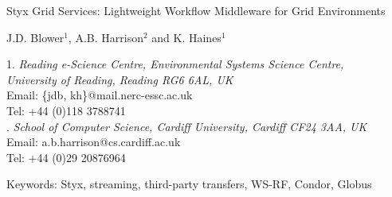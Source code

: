 \documentclass[a4paper]{article}
\begin{document}
\doublespacing

\begin{center}
{\Large Styx Grid Services: Lightweight Workflow Middleware for Grid Environments}

\bigskip
\bigskip

{\large J.D. Blower$^{1}$, A.B. Harrison$^{2}$ and K. Haines$^{1}$}

\bigskip

{\small 1. \textit{Reading e-Science Centre, Environmental Systems Science Centre, \\
University of Reading, Reading RG6 6AL, UK} \\
Email: \{jdb, kh\}@mail.nerc-essc.ac.uk\\
Tel: +44 (0)118 3788741 \\
. \textit{School of Computer Science, Cardiff University, Cardiff CF24 3AA, UK}\\
Email: a.b.harrison@cs.cardiff.ac.uk\\
Tel: +44 (0)29 20876964}

\bigskip
\bigskip

Keywords: Styx, streaming, third-party transfers, WS-RF, Condor, Globus

\end{center}

\newpage

\begin{abstract}
The service-oriented approach to performing distributed scientific research is potentially very powerful but is not yet widely used in many scientific fields.  This is partly due to the technical difficulties involved in creating services and workflows and the inefficiency of many workflow systems with regard to handling large datasets.  We present the Styx Grid Service, a simple system that wraps command-line programs and allows them to be run over the Internet exactly as if they were local programs.  Styx Grid Services are very easy to create and use and can be composed into powerful workflows with simple shell scripts or more sophisticated graphical tools.  An important feature of the system is that data can be streamed directly from service to service, significantly increasing the efficiency of workflows that use large data volumes.  The status and progress of Styx Grid Services can be monitored asynchronously using a mechanism that places very few demands on firewalls.  Styx Grid Services can interoperate with with Web Services and WS-Resources using suitable wrappers and brokers.
\end{abstract}
\end{document}
